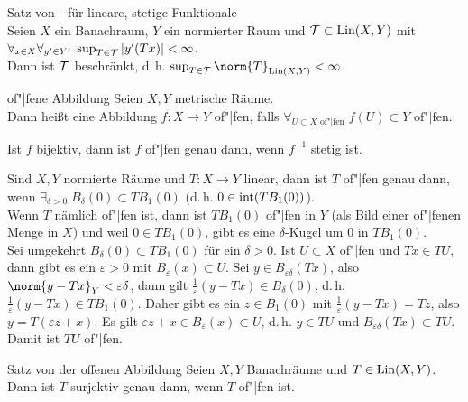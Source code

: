 \begin{Satz}{Satz von - für lineare, stetige Funktionale}\\
    Seien $X$ ein Banachraum, $Y$ ein normierter Raum und
    $\mathcal{T} \subset \operatorname{Lin}(X, Y)$ mit\\
    $\forall_{x \in X} \forall_{y' \in Y'}\; \sup_{T \in \mathcal{T}} |y'(Tx)| < \infty$.\\
    Dann ist $\mathcal{T}$ beschränkt, d.\,h. $\sup_{T \in \T} \norm{T}_{\Lin(X, Y)} < \infty$.
\end{Satz}

\linie

\begin{Def}{of"|fene Abbildung}
    Seien $X, Y$ metrische Räume.\\
    Dann heißt eine Abbildung $f\colon X \rightarrow Y$ of"|fen, falls
    $\forall_{U \subset X \text{ of"|fen}}\; f(U) \subset Y \text{ of"|fen}$.
\end{Def}

\begin{Bem}
    Ist $f$ bijektiv, dann ist $f$ of"|fen genau dann, wenn $f^{-1}$ stetig ist.
\end{Bem}

\begin{Bem}
    Sind $X, Y$ normierte Räume und $T\colon X \rightarrow Y$ linear,
    dann ist $T$ of"|fen genau dann, wenn $\exists_{\delta > 0}\; B_\delta(0) \subset TB_1(0)$
    (d.\,h. $0 \in \operatorname{int}(TB_1(0))$).\\
    Wenn $T$ nämlich of"|fen ist, dann ist $TB_1(0)$ of"|fen in $Y$
    (als Bild einer of"|fenen Menge in $X$) und weil $0 \in TB_1(0)$, gibt es eine
    $\delta$-Kugel um $0$ in $TB_1(0)$.\\
    Sei umgekehrt $B_\delta(0) \subset TB_1(0)$ für ein $\delta > 0$.
    Ist $U \subset X$ of"|fen und $Tx \in TU$, dann gibt es ein $\varepsilon > 0$ mit
    $B_\varepsilon(x) \subset U$.
    Sei $y \in B_{\varepsilon\delta}(Tx)$, also $\norm{y - Tx}_Y < \varepsilon\delta$,
    dann gilt $\frac{1}{\varepsilon} (y - Tx) \in B_\delta(0)$,
    d.\,h. $\frac{1}{\varepsilon} (y - Tx) \in TB_1(0)$.
    Daher gibt es ein $z \in B_1(0)$ mit $\frac{1}{\varepsilon} (y - Tx) = Tz$,
    also $y = T(\varepsilon z + x)$.
    Es gilt $\varepsilon z + x \in B_\varepsilon(x) \subset U$,
    d.\,h. $y \in TU$ und $B_{\varepsilon\delta}(Tx) \subset TU$.
    Damit ist $TU$ of"|fen.
\end{Bem}

\begin{Satz}{Satz von der of{}fenen Abbildung}
    Seien $X, Y$ Banachräume und $T \in \operatorname{Lin}(X, Y)$.\\
    Dann ist $T$ surjektiv genau dann, wenn $T$ of"|fen ist.
\end{Satz}

